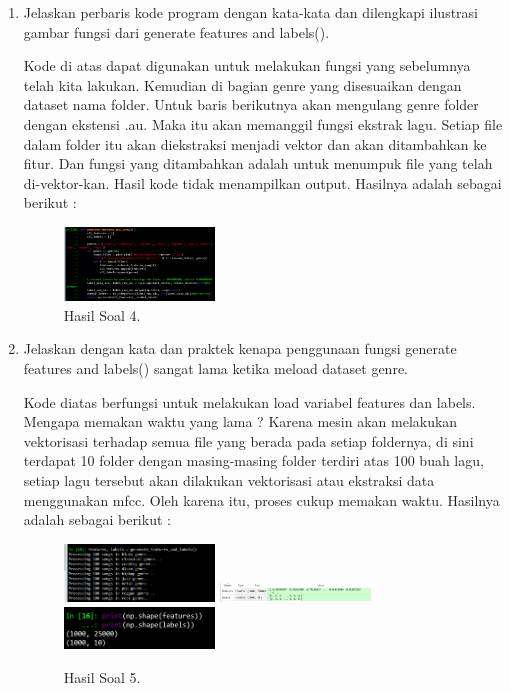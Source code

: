 \begin{enumerate}
	\item Jelaskan perbaris kode program dengan kata-kata dan dilengkapi ilustrasi gambar fungsi dari generate features and labels().
	\hfill\break
	
	Kode di atas dapat digunakan untuk melakukan fungsi yang sebelumnya telah kita lakukan. Kemudian di bagian genre yang disesuaikan dengan dataset nama folder. Untuk baris berikutnya akan mengulang genre folder dengan ekstensi .au. Maka itu akan memanggil fungsi ekstrak lagu. Setiap file dalam folder itu akan diekstraksi menjadi vektor dan akan ditambahkan ke fitur. Dan fungsi yang ditambahkan adalah untuk menumpuk file yang telah di-vektor-kan. Hasil kode tidak menampilkan output. Hasilnya adalah sebagai berikut :
	\begin{figure}[H]
	\centering
		\includegraphics[width=4cm]{figures/1174096/tugas6/hasil4.PNG}
		\caption{Hasil Soal 4.}
	\end{figure}

	\item Jelaskan dengan kata dan praktek kenapa penggunaan fungsi generate features and labels() sangat lama ketika meload dataset genre. 
	\hfill\break
	
	Kode diatas berfungsi untuk melakukan load variabel features dan labels. Mengapa memakan waktu yang lama ? Karena mesin akan melakukan vektorisasi terhadap semua file yang berada pada setiap foldernya, di sini terdapat 10 folder dengan masing-masing folder terdiri atas 100 buah lagu, setiap lagu tersebut akan dilakukan vektorisasi atau ekstraksi data menggunakan mfcc. Oleh karena itu, proses cukup memakan waktu. Hasilnya adalah sebagai berikut :
	\begin{figure}[H]
	\centering
		\includegraphics[width=4cm]{figures/1174096/tugas6/hasil5_1.PNG}
		\includegraphics[width=4cm]{figures/1174096/tugas6/hasil5_2.PNG}
		\includegraphics[width=4cm]{figures/1174096/tugas6/hasil5_3.PNG}
		\caption{Hasil Soal 5.}
	\end{figure}


\end{enumerate}

